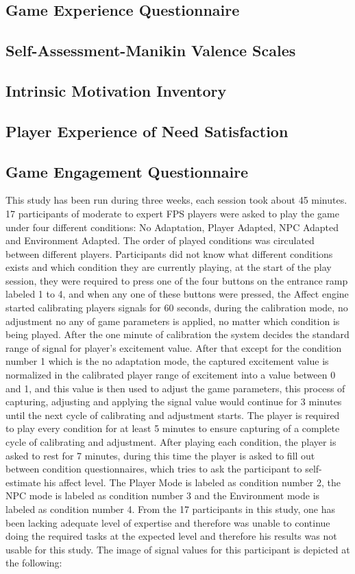 \subsection{Game Experience Questionnaire}
\subsection{Self-Assessment-Manikin Valence Scales}
\subsection{Intrinsic Motivation Inventory}
\subsection{Player Experience of Need Satisfaction}
\subsection{Game Engagement Questionnaire}

This study has been run during three weeks, each session took about
45 minutes. 17 participants of moderate to expert FPS players were
asked to play the game under four different conditions: No
Adaptation, Player Adapted, NPC Adapted and Environment Adapted.
The order of played conditions was circulated between different players.
Participants did not know what different conditions exists and
which condition they are currently playing, at the start of the play
session, they were required to press one of the four buttons on the
entrance ramp labeled 1 to 4, and when any one of these buttons were
pressed, the Affect engine started calibrating players signals for 60
seconds, during the calibration mode, no adjustment no any of game
parameters is applied, no matter which condition is being played.
After the one minute of calibration the system decides the standard
range of signal for player’s excitement value. After that except for
the condition number 1 which is the no adaptation mode, the captured
excitement value is normalized in the calibrated player range of
excitement into a value between 0 and 1, and this value is then used to
adjust the game parameters, this process of capturing, adjusting and
applying the signal value would continue for 3 minutes until the
next cycle of calibrating and adjustment starts. The player is
required to play every condition for at least 5 minutes to ensure
capturing of a complete cycle of calibrating and adjustment.
After playing each condition, the player is asked to rest for 7
minutes, during this time the player is asked to fill out between
condition questionnaires, which tries to ask the participant to
self-estimate his affect level.
The Player Mode is labeled as condition number 2, the NPC mode is
labeled as condition number 3 and the Environment mode is labeled
as condition number 4. From the 17 participants in this study,
one has been lacking adequate level of expertise and therefore was
unable to continue doing the required tasks at the expected level
and therefore his results was not usable for this study.
The image of signal values for this participant is depicted at the
following:

